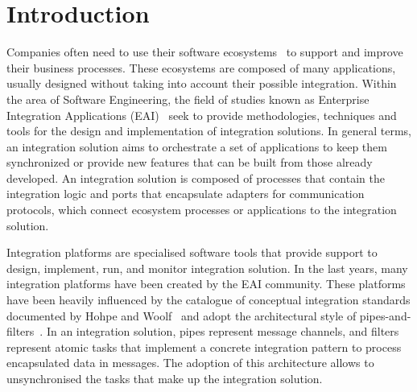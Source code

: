 
\section{Introduction}
\label{sec:introduction}

\noindent 
Companies often need to use their software ecosystems~\cite{messerschmitt:2005} to support and improve their business processes. These ecosystems are composed of many applications, usually designed without taking into account their possible integration. Within the area of Software Engineering, the field of studies known as Enterprise Integration Applications (EAI)~\cite{frantz2016} seek to provide methodologies, techniques and tools for the design and implementation of integration solutions. In general terms, an integration solution aims to orchestrate a set of applications to keep them synchronized or provide new features that can be built from those already developed. An integration solution is composed of processes that contain the integration logic and ports that encapsulate adapters for communication protocols, which connect ecosystem processes or applications to the integration solution.

Integration platforms are specialised software tools that provide support to design, implement, run, and monitor integration solution. 
In the last years, many integration platforms have been created by the EAI community. These platforms have been heavily influenced by the catalogue of conceptual integration standards documented by Hohpe and Woolf~\cite{hohpe2004} and adopt the architectural style of pipes-and-filters~\cite{alexander1977}. In an integration solution, pipes represent message channels, and filters represent atomic tasks that implement a concrete integration pattern to process encapsulated data in messages. The adoption of this architecture allows to unsynchronised the tasks that make up the integration solution.

